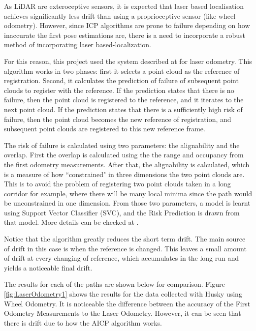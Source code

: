 \documentclass[11pt]{article}
\begin{document}
As LiDAR are exteroceptive sensors, it is expected that laser based localisation achieves significantly less drift than using a proprioceptive sensor (like wheel odometry). However, since ICP algorithms are prone to failure depending on how inaccurate the first pose estimations are, there is a need to incorporate a robust method of incorporating laser based-localization.
	
For this reason, this project used the system described at \cite{AICPAlign} for laser odometry. This algorithm works in two phases: first it selects a point cloud as the reference of registration. Second, it calculates the prediction of failure of subsequent point clouds to register with the reference. If the prediction states that there is no failure, then the point cloud is registered to the reference, and it iterates to the next point cloud. If the prediction states that there is a sufficiently high risk of failure, then the point cloud becomes the new reference of registration, and subsequent point clouds are registered to this new reference frame.
	
The risk of failure is calculated using two parameters: the alignability and the overlap. First the overlap is calculated using the the range and occupancy from the first odometry measurements. After that, the alignability is calculated, which is a measure of how ``constrained" in three dimensions the two point clouds are. This is to avoid the problem of registering two point clouds taken in a long corridor for example, where there will be many local minima since the path would be unconstrained in one dimension. From those two parameters, a model is learnt using Support Vector Classifier (SVC), and the Risk Prediction is drawn from that model. More details can be checked at \cite{AICPAlign}.

Notice that the algorithm greatly reduces the short term drift. The main source of drift in this case is when the reference is changed. This leaves a small amount of drift at every changing of reference, which accumulates in the long run and yields a noticeable final drift.
	
The results for each of the paths are shown below for comparison. Figure \ref{fig:LaserOdometry1} shows the results for the data collected with Husky using Wheel Odometry. It is noticeable the difference between the accuracy of the First Odometry Measurements to the Laser Odometry. However, it can be seen that there is drift due to how the AICP algorithm works.
\end{document}
